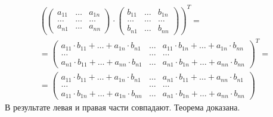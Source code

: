\begin{theorem}
\begin{gather*}
        \left(
        \begin{pmatrix}
            a_{11} & \dots & a_{1n} \\
            \dots  & \dots & \dots  \\
            a_{n1} & \dots & a_{nn}
        \end{pmatrix}
        \cdot
        \begin{pmatrix}
            b_{11} & \dots & b_{1n} \\
            \dots  & \dots & \dots  \\
            b_{n1} & \dots & b_{nn}
        \end{pmatrix}
        \right)^T
        = \\
        = \begin{pmatrix}
              a_{11} \cdot b_{11} + \dots + a_{1n} \cdot b_{n1} & \dots & a_{11} \cdot b_{1n} + \dots + a_{1n} \cdot b_{nn} \\
              \dots                                             & \dots & \dots                                             \\
              a_{n1} \cdot b_{11} + \dots + a_{nn} \cdot b_{n1} & \dots & a_{n1} \cdot b_{1n} + \dots + a_{nn} \cdot b_{nn}
        \end{pmatrix}^T = \\
        = \begin{pmatrix}
              a_{11} \cdot b_{11} + \dots + a_{1n} \cdot b_{n1} & \dots & a_{n1} \cdot b_{11} + \dots + a_{nn} \cdot b_{n1} \\
              \dots                                             & \dots & \dots                                             \\
              a_{11} \cdot b_{1n} + \dots + a_{1n} \cdot b_{nn} & \dots & a_{n1} \cdot b_{1n} + \dots + a_{nn} \cdot b_{nn}
        \end{pmatrix}
    \end{gather*}
    В результате левая и правая части совпадают. Теорема доказана.
\end{theorem}

